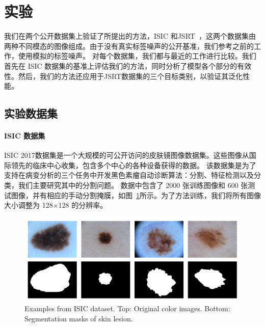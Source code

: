 \section{实验}

我们在两个公开数据集上验证了所提出的方法，ISIC\citep{Gutman2018SkinLA} 和JSRT~\citep{Shiraishi2000DevelopmentOA,Ginneken2006SegmentationOA}，这两个数据集由两种不同模态的图像组成。由于没有真实标签噪声的公开基准，我们参考之前的工作，使用模拟的标签噪声。
对每个数据集，我们都与最近的工作进行比较。我们首先在 ISIC 数据集的基准上评估我们的方法，同时分析了模型各个部分的有效性。然后，我们的方法还应用于JSRT数据集的三个目标类别，以验证其泛化性能。

\subsection{实验数据集}
\paragraph{ISIC 数据集}
ISIC 2017数据集\citep{Gutman2018SkinLA}是一个大规模的可公开访问的皮肤镜图像数据集。这些图像从国际领先的临床中心收集，包含多个中心的各种设备获得的数据。
该数据集是为了支持在病变分析的三个任务中开发黑色素瘤自动诊断算法：分割、特征检测以及分类，我们主要研究其中的分割问题。
数据中包含了 2000 张训练图像和 600 张测试图像，并有相应的手动分割掩膜，如图~\ref{fig:isic_intro}所示。为了方法训练，我们将所有图像大小调整为 128$\times$128 的分辨率。
    \begin{figure}[tbp]
        \centering 
        \includegraphics[width=1.0\textwidth]{img/c4/c_isic.png}
        {Examples from ISIC dataset. Top: Original color images. Bottom: Segmentation masks of skin lesion.}
        \label{fig:isic_intro}
    \end{figure}


